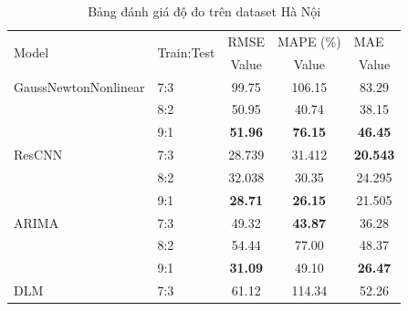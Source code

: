 \documentclass[conference]{IEEEtran}
\begin{document}
\begin{table}[H]
    \centering
    \caption{Bảng đánh giá độ đo trên dataset Hà Nội}
    \begin{tabular}{|l|l|c|c|c|}
        \hline
        \multirow{2}{*}{Model} & \multirow{2}{*}{Train:Test} & \multicolumn{1}{l|}{RMSE} & \multicolumn{1}{l|}{MAPE (\%)} & \multicolumn{1}{l|}{MAE} \\ \cline{3-5}
                               &                             & Value                     & Value                          & Value                    \\ \hline
        GaussNewtonNonlinear   & 7:3                         & 99.75                     & 106.15                         & 83.29                    \\ \cline{2-5}
                               & 8:2                         & 50.95                     & 40.74                          & 38.15                    \\ \cline{2-5}
                               & 9:1                         & \textbf{51.96}            & \textbf{76.15}                 & \textbf{46.45}           \\ \hline
        ResCNN                 & 7:3                         & 28.739                    & 31.412                         & \textbf{20.543}          \\ \cline{2-5}
                               & 8:2                         & 32.038                    & 30.35                          & 24.295                   \\ \cline{2-5}
                               & 9:1                         & \textbf{28.71}            & \textbf{26.15}                 & 21.505                   \\ \hline
        ARIMA                  & 7:3                         & 49.32                     & \textbf{43.87}                 & 36.28                    \\ \cline{2-5}
                               & 8:2                         & 54.44                     & 77.00                          & 48.37                    \\ \cline{2-5}
                               & 9:1                         & \textbf{31.09}            & 49.10                          & \textbf{26.47}           \\ \hline
        DLM                    & 7:3                         & 61.12                     & 114.34                         & 52.26                    \\ \cline{2-5}

\end{tabular}
\end{table}
\end{document}
